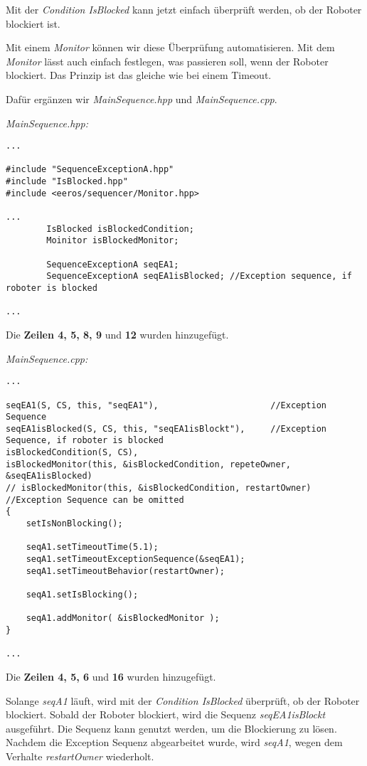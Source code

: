 Mit der \textit{Condition IsBlocked} kann jetzt einfach überprüft werden, ob der Roboter blockiert ist.

Mit einem \textit{Monitor} können wir diese Überprüfung automatisieren.
Mit dem \textit{Monitor} lässt auch einfach festlegen, was passieren soll, wenn der Roboter blockiert.
Das Prinzip ist das gleiche wie bei einem Timeout.

Dafür ergänzen wir \textit{MainSequence.hpp} und \textit{MainSequence.cpp}.

\textit{MainSequence.hpp:}\
\begin{lstlisting}
...

#include "SequenceExceptionA.hpp"
#include "IsBlocked.hpp"
#include <eeros/sequencer/Monitor.hpp>

...
		IsBlocked isBlockedCondition;
		Moinitor isBlockedMonitor;
		
		SequenceExceptionA seqEA1;
		SequenceExceptionA seqEA1isBlocked;	//Exception sequence, if roboter is blocked
		
...
\end{lstlisting}

Die \textbf{Zeilen 4, 5, 8, 9} und \textbf{12} wurden hinzugefügt.

\textit{MainSequence.cpp:}\
\begin{lstlisting}
...

seqEA1(S, CS, this, "seqEA1"),						//Exception Sequence
seqEA1isBlocked(S, CS, this, "seqEA1isBlockt"),		//Exception Sequence, if roboter is blocked
isBlockedCondition(S, CS),
isBlockedMonitor(this, &isBlockedCondition, repeteOwner, &seqEA1isBlocked)
// isBlockedMonitor(this, &isBlockedCondition, restartOwner)	//Exception Sequence can be omitted
{
	setIsNonBlocking();
	
	seqA1.setTimeoutTime(5.1);
	seqA1.setTimeoutExceptionSequence(&seqEA1);
	seqA1.setTimeoutBehavior(restartOwner);
	
	seqA1.setIsBlocking();
	
	seqA1.addMonitor( &isBlockedMonitor );
}

...
\end{lstlisting}

Die \textbf{Zeilen 4, 5, 6} und \textbf{16} wurden hinzugefügt.

Solange \textit{seqA1} läuft, wird mit der \textit{Condition IsBlocked} überprüft, ob der Roboter blockiert.
Sobald der Roboter blockiert, wird die Sequenz \textit{seqEA1isBlockt} ausgeführt.
Die Sequenz kann genutzt werden, um die Blockierung zu lösen.
Nachdem die Exception Sequenz abgearbeitet wurde, wird \textit{seqA1}, wegen dem Verhalte \textit{restartOwner} wiederholt.

